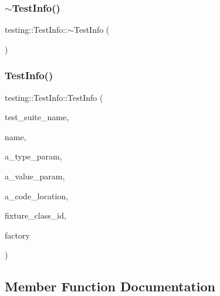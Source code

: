 \subsubsection{\texorpdfstring{$\sim$\+Test\+Info()}{~TestInfo()}}
{\footnotesize\ttfamily testing\+::\+Test\+Info\+::$\sim$\+Test\+Info (\begin{DoxyParamCaption}{ }\end{DoxyParamCaption})}

\mbox{\label{classtesting_1_1TestInfo_aa652b2ec74957083637ece79297b274b}} 
\subsubsection{\texorpdfstring{Test\+Info()}{TestInfo()}}
{\footnotesize\ttfamily testing\+::\+Test\+Info\+::\+Test\+Info (\begin{DoxyParamCaption}\item[{const std\+::string \&}]{test\+\_\+suite\+\_\+name,  }\item[{const std\+::string \&}]{name,  }\item[{const char $\ast$}]{a\+\_\+type\+\_\+param,  }\item[{const char $\ast$}]{a\+\_\+value\+\_\+param,  }\item[{\hyperlink{structtesting_1_1internal_1_1CodeLocation}{internal\+::\+Code\+Location}}]{a\+\_\+code\+\_\+location,  }\item[{\hyperlink{namespacetesting_1_1internal_ab1114197d3c657d8b7f8e0c5caa12d00}{internal\+::\+Type\+Id}}]{fixture\+\_\+class\+\_\+id,  }\item[{\hyperlink{classtesting_1_1internal_1_1TestFactoryBase}{internal\+::\+Test\+Factory\+Base} $\ast$}]{factory }\end{DoxyParamCaption})\hspace{0.3cm}{\ttfamily [private]}}



\subsection{Member Function Documentation}
\mbox{\label{classtesting_1_1TestInfo_ac6d80865a3e68478aaf167058e6ca5c2}} 
